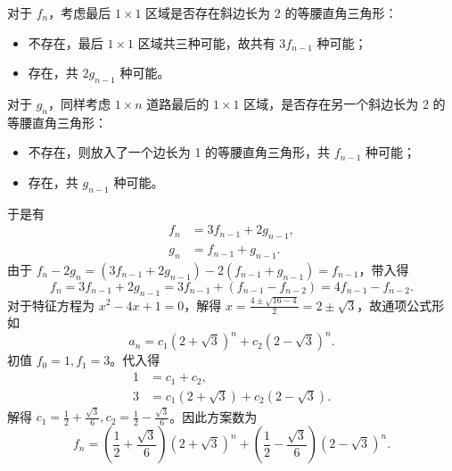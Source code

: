 \documentclass{article}
\begin{document}
对于 $f_n$，考虑最后 $1\times 1$ 区域是否存在斜边长为 2 的等腰直角三角形：
\begin{itemize}
    \item 不存在，最后 $1\times 1$ 区域共三种可能，故共有 $3f_{n-1}$ 种可能；
    \item 存在，共 $2g_{n-1}$ 种可能。
\end{itemize}
对于 $g_n$，同样考虑 $1\times n$ 道路最后的 $1\times 1$ 区域，是否存在另一个斜边长为 2 的等腰直角三角形：
\begin{itemize}
    \item 不存在，则放入了一个边长为 1 的等腰直角三角形，共 $f_{n-1}$ 种可能；
    \item 存在，共 $g_{n-1}$ 种可能。
\end{itemize}
于是有
\begin{align}
    f_n&=3f_{n-1}+2g_{n-1}, \\
    g_n&=f_{n-1}+g_{n-1}.
\end{align}
由于 $f_n-2g_n=(3f_{n-1}+2g_{n-1})-2(f_{n-1}+g_{n-1})=f_{n-1}$，带入得
\begin{equation}
    f_n=3f_{n-1}+2g_{n-1}=3f_{n-1}+(f_{n-1}-f_{n-2})=4f_{n-1}-f_{n-2}.
\end{equation}
对于特征方程为 $x^2-4x+1=0$，解得 $x=\frac{4\pm\sqrt{16-4}}{2}=2\pm\sqrt 3$，故通项公式形如
\begin{equation}
    a_n=c_1(2+\sqrt 3)^n+c_2(2-\sqrt 3)^n.
\end{equation}
初值 $f_0=1,f_1=3$。代入得
\begin{align}
    1&=c_1+c_2, \\
    3&=c_1(2+\sqrt 3)+c_2(2-\sqrt 3).
\end{align}
解得 $c_1=\frac 12+\frac{\sqrt 3}{6},c_2=\frac 12-\frac{\sqrt 3}{6}$。因此方案数为
\begin{equation}
    f_n=\left(\frac 12+\frac{\sqrt 3}{6}\right)(2+\sqrt 3)^n+\left(\frac 12-\frac{\sqrt 3}{6}\right)(2-\sqrt 3)^n.
\end{equation}
\end{document}
